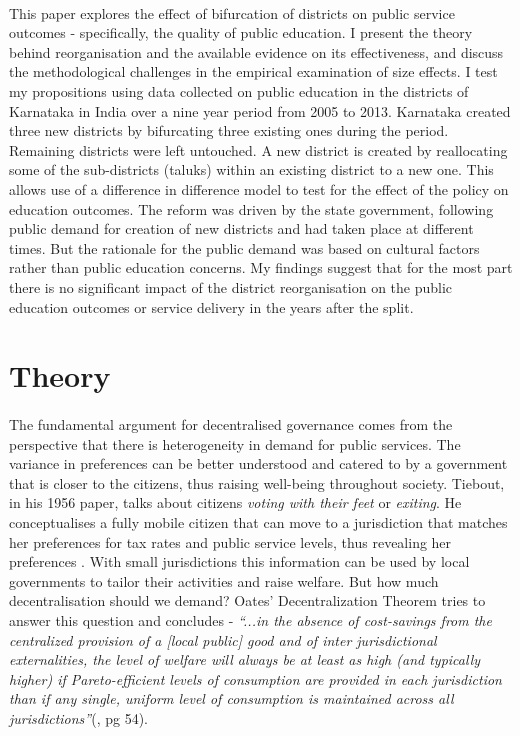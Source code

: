 \documentclass[12pt, a4paper]{article}
\begin{document}
\paragraph{}This paper explores the effect of bifurcation of districts on public service outcomes - specifically, the quality of public education. I present the theory behind reorganisation and the available evidence on its effectiveness, and discuss the methodological challenges in the empirical examination of size effects. I test my propositions using data collected on public education in the districts of Karnataka in India over a nine year period from 2005 to 2013. Karnataka created three new districts by bifurcating three existing ones during the period. Remaining districts were left untouched. A new district is created by reallocating some of the sub-districts (taluks) within an existing district to a new one. This allows use of a difference in difference model to test for the effect of the policy on education outcomes. The reform was driven by the state government, following public demand for creation of new districts and had taken place at different times. But the rationale for the public demand was based on cultural factors rather than public education concerns. My findings suggest that for the most part there is no significant impact of the district reorganisation on the public education outcomes or service delivery in the years after the split.
	
\section*{Theory}
\paragraph{} The fundamental argument for decentralised governance comes from the perspective that there is heterogeneity in demand for public services. The variance in preferences can be better understood and catered to by a government that is closer to the citizens, thus raising well-being throughout society. Tiebout, in his 1956 paper, talks about citizens \textit{voting with their feet} or \textit{exiting}. He conceptualises a fully mobile citizen that can move to a jurisdiction that matches her preferences for tax rates and public service levels, thus revealing her preferences \parencite{tiebout_economies_1960}. With small jurisdictions this information can be used by local governments to tailor their activities and raise welfare. But how much decentralisation should we demand? Oates' Decentralization Theorem tries to answer this question and concludes - \textit{``...in the absence of cost-savings from the centralized provision of a [local public] good and of inter jurisdictional externalities, the level of welfare will always be at least as high (and typically higher) if Pareto-efficient levels of consumption are provided in each jurisdiction than if any single, uniform level of consumption is maintained across all jurisdictions''}(\cite{oates_fiscal_1972}, pg 54). \nocite{oates1999essay}
	
\end{document}
